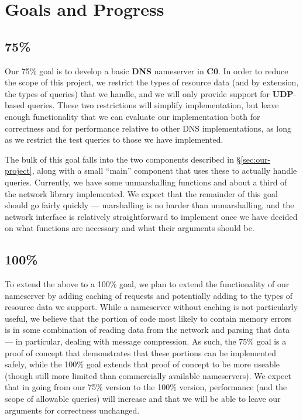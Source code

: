 \documentclass{article}
\newcommand\Kwd[1]{{\sffamily\bfseries{#1}}}
\begin{document}
\section{Goals and Progress}

\subsection{75\%}

Our 75\% goal is to develop a basic \Kwd{DNS} nameserver in \Kwd{C0}. In order to reduce the scope of this project, we restrict the types of resource data (and by extension, the types of queries) that we handle, and we will only provide support for \Kwd{UDP}-based queries. These two restrictions will simplify implementation, but leave enough functionality that we can evaluate our implementation both for correctness and for performance relative to other DNS implementations, as long as we restrict the test queries to those we have implemented.

The bulk of this goal falls into the two components described in \S\ref{sec:our-project}, along with a small ``main'' component that uses these to actually handle queries. Currently, we have some unmarshalling functions and about a third of the network library implemented. We expect that the remainder of this goal should go fairly quickly --- marshalling is no harder than unmarshalling, and the network interface is relatively straightforward to implement once we have decided on what functions are necessary and what their arguments should be.

\subsection{100\%}

To extend the above to a 100\% goal, we plan to extend the functionality of our nameserver by adding caching of requests and potentially adding to the types of resource data we support. While a nameserver without caching is not particularly useful, we believe that the portion of code most likely to contain memory errors is in some combination of reading data from the network and parsing that data --- in particular, dealing with message compression. As such, the 75\% goal is a proof of concept that demonstrates that these portions can be implemented safely, while the 100\% goal extends that proof of concept to be more useable (though still more limited than commercially available nameservers). We expect that in going from our 75\% version to the 100\% version, performance (and the scope of allowable queries) will increase and that we will be able to leave our arguments for correctness unchanged.
\end{document}
